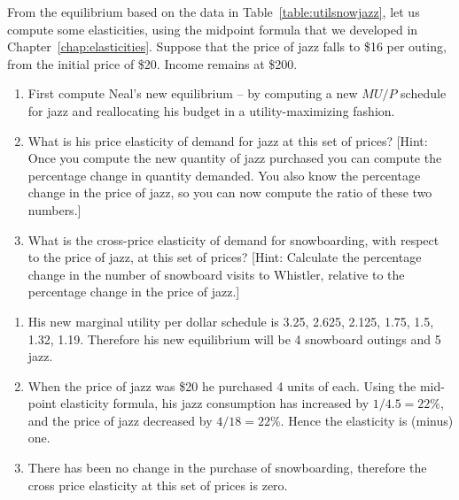 \begin{enumialphparenastyle}
\begin{ex}\label{ex:ch6ex13}
From the equilibrium based on the data in Table~\ref{table:utilsnowjazz}, let us compute some elasticities, using the midpoint formula that we developed in Chapter~\ref{chap:elasticities}. Suppose that the price of jazz falls to \$16 per outing, from the initial price of \$20. Income remains at \$200.
\begin{enumerate}
	\item	First compute Neal's new equilibrium -- by computing a new $MU/P$ schedule for jazz and reallocating his budget in a utility-maximizing fashion.
	\item	What is his price elasticity of demand for jazz at this set of prices? [Hint: Once you compute the new quantity of jazz purchased you can compute the percentage change in quantity demanded. You also know the percentage change in the price of jazz, so you can now compute the ratio of these two numbers.]
	\item	What is the cross-price elasticity of demand for snowboarding, with respect to the price of jazz, at this set of prices? [Hint: Calculate the percentage change in the number of snowboard visits to Whistler, relative to the percentage change in the price of jazz.]
\end{enumerate}
\begin{sol}
\begin{enumerate}
	\item	His new marginal utility per dollar schedule is 3.25, 2.625, 2.125, 1.75, 1.5, 1.32, 1.19. Therefore his new equilibrium will be 4 snowboard outings and 5 jazz.
	\item	When the price of jazz was \$20 he purchased 4 units of each. Using the mid-point elasticity formula, his jazz consumption has
	increased by $1/4.5=22\%$, and the price of jazz decreased by $4/18=22\%$. Hence the elasticity is (minus) one.
	\item	There has been no change in the purchase of snowboarding, therefore the cross price elasticity at this set of prices is zero.
\end{enumerate}
\end{sol}
\end{ex}


\end{enumialphparenastyle}
